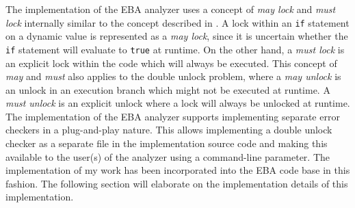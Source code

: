 \noindent The implementation of the EBA analyzer uses a concept of \textit{may lock} and \textit{must lock} internally similar to the concept described in \cite{Godefroid}. A lock within an \texttt{if} statement on a dynamic value is represented as a \textit{may lock}, since it is uncertain whether the \texttt{if} statement will evaluate to \texttt{true} at runtime. On the other hand, a \textit{must lock} is an explicit lock within the code which will always be executed. This concept of \textit{may} and \textit{must} also applies to the double unlock problem, where a \textit{may unlock} is an unlock in an execution branch which might not be executed at runtime. A \textit{must unlock} is an explicit unlock where a lock will always be unlocked at runtime. \\

\noindent The implementation of the EBA analyzer supports implementing separate error checkers in a plug-and-play nature. This allows implementing a double unlock checker as a separate file in the implementation source code and making this available to the user(s) of the analyzer using a command-line parameter. The implementation of my work has been incorporated into the EBA code base in this fashion. The following section will elaborate on the implementation details of this implementation. 